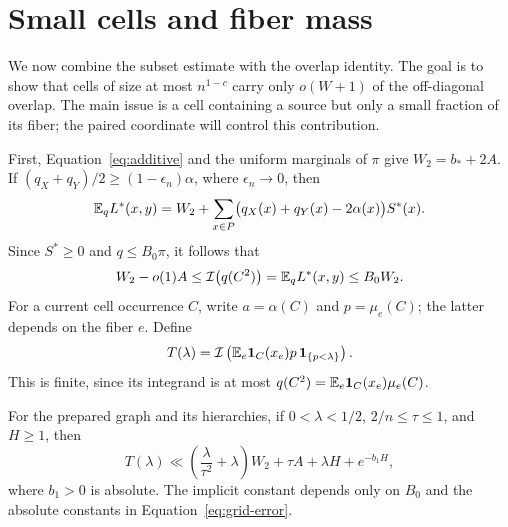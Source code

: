 \section{Small cells and fiber mass}\label{sec:smallcells}

We now combine the subset estimate with the overlap identity.  The goal is
to show that cells of size at most $n^{1-c}$ carry only $o(W+1)$ of the
off-diagonal overlap.  The main issue is a cell containing a source but
only a small fraction of its fiber; the paired coordinate will control
this contribution.

First, Equation~\eqref{eq:additive} and the uniform marginals of $\pi$
give $W_2=b_*+2A$.  If
$(q_X+q_Y)/2\ge(1-\epsilon_n)\alpha$, where $\epsilon_n\to0$, then
\[
 \mathbb E_q L^*(x,y)
 =W_2+\sum_{x\in P}
   \bigl(q_X(x)+q_Y(x)-2\alpha(x)\bigr)S^*(x).
\]
Since $S^*\ge0$ and $q\le B_0\pi$, it follows that
\begin{equation}\label{eq:q-overlap}
 W_2-o(1)A
 \le \mathcal I\bigl(q(C^2)\bigr)
 =\mathbb E_q L^*(x,y)
 \le B_0W_2.
\end{equation}
For a current cell occurrence $C$, write $a=\alpha(C)$ and
$p=\mu_e(C)$; the latter depends on the fiber $e$.  Define
\[
 T(\lambda)=\mathcal I\left(
   \mathbb E_e\mathbf 1_C(x_e)p\,\mathbf 1_{\{p<\lambda\}}\right).
\]
This is finite, since its integrand is at most
$q(C^2)=\mathbb E_e\mathbf 1_C(x_e)\mu_e(C)$.

\begin{lemma}\label{lem:small-fiber}
For the prepared graph and its hierarchies, if
$0<\lambda<1/2$, $2/n\le\tau\le1$, and $H\ge1$, then
\begin{equation}\label{eq:small-fiber}
 T(\lambda)\ll
 \left(\frac{\lambda}{\tau^2}+\lambda\right)W_2
 +\tau A+\lambda H+e^{-b_1H},
\end{equation}
where $b_1>0$ is absolute.  The implicit constant depends only on $B_0$
and the absolute constants in Equation~\eqref{eq:grid-error}.
\end{lemma}

